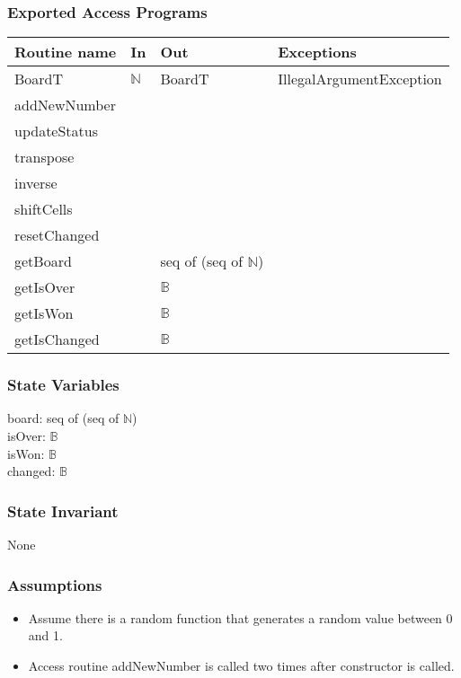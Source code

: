 \documentclass[12pt]{article}
\begin{document}
\subsubsection* {Exported Access Programs}

\begin{tabular}{| l | l | l | l |}
\hline
\textbf{Routine name} & \textbf{In} & \textbf{Out} & \textbf{Exceptions}\\
\hline
BoardT & $\mathbb{N}$ & BoardT & IllegalArgumentException\\
\hline
addNewNumber &  &  & \\
\hline
updateStatus &  &  & \\
\hline
transpose &  &  & \\
\hline
inverse &  &  & \\
\hline
shiftCells &  &  & \\
\hline
resetChanged  &  &  & \\
\hline
getBoard  &  & seq of (seq of $\mathbb{N}$) & \\
\hline
getIsOver  &  & $\mathbb{B}$ & \\
\hline
getIsWon  &  & $\mathbb{B}$ & \\
\hline
getIsChanged   &  & $\mathbb{B}$ & \\
\hline
\end{tabular}

\subsubsection* {State Variables}

board: seq of (seq of $\mathbb{N}$) \\
isOver: $\mathbb{B}$ \\
isWon: $\mathbb{B}$ \\
changed: $\mathbb{B}$

\subsubsection* {State Invariant}
None

\subsubsection* {Assumptions}
\begin{itemize}
  \item Assume there is a random function that generates a random value between 0 and 1.
  \item Access routine addNewNumber is called two times after constructor is called.
\end{itemize}
\end{document}
